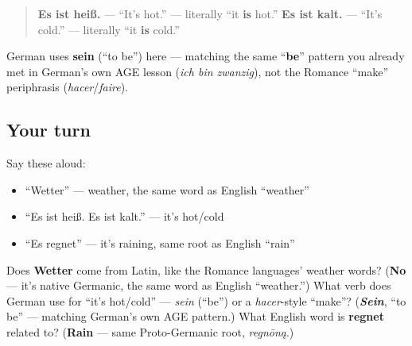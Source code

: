 \begin{grammarlens}[title={Grammar Lens: Es ist heiß / Es ist kalt}]
\begin{quote}
\textbf{Es ist heiß.} — \textquotedblleft{}It's hot.\textquotedblright{} — literally \textquotedblleft{}it \textbf{is} hot.\textquotedblright{} \textbf{Es ist kalt.} — \textquotedblleft{}It's cold.\textquotedblright{} — literally \textquotedblleft{}it \textbf{is} cold.\textquotedblright{}
\end{quote}

German uses \textbf{sein} (\textquotedblleft{}to be\textquotedblright{}) here — matching the same \textquotedblleft{}\textbf{be}\textquotedblright{} pattern you already met in German's own AGE lesson (\emph{ich bin zwanzig}), not the Romance \textquotedblleft{}make\textquotedblright{} periphrasis (\emph{hacer}/\emph{faire}).
\end{grammarlens}

\subsection*{Your turn}
Say these aloud:

\begin{itemize}
\raggedright
  \item \textquotedblleft{}Wetter\textquotedblright{} — weather, the same word as English \textquotedblleft{}weather\textquotedblright{}
  \item \textquotedblleft{}Es ist heiß. Es ist kalt.\textquotedblright{} — it's hot/cold
  \item \textquotedblleft{}Es regnet\textquotedblright{} — it's raining, same root as English \textquotedblleft{}rain\textquotedblright{}
\end{itemize}

\begin{tcolorbox}[breakable,colback=teal!4,colframe=teal!35!black,title={Before you move on}]
Does \textbf{Wetter} come from Latin, like the Romance languages' weather words? (\textbf{No} — it's native Germanic, the same word as English \textquotedblleft{}weather.\textquotedblright{}) What verb does German use for \textquotedblleft{}it's hot/cold\textquotedblright{} — \emph{sein} (\textquotedblleft{}be\textquotedblright{}) or a \emph{hacer}-style \textquotedblleft{}make\textquotedblright{}? (\emph{\textbf{Sein}}, \textquotedblleft{}to be\textquotedblright{} — matching German's own AGE pattern.) What English word is \textbf{regnet} related to? (\textbf{Rain} — same Proto-Germanic root, \emph{regnōną}.)
\end{tcolorbox}
